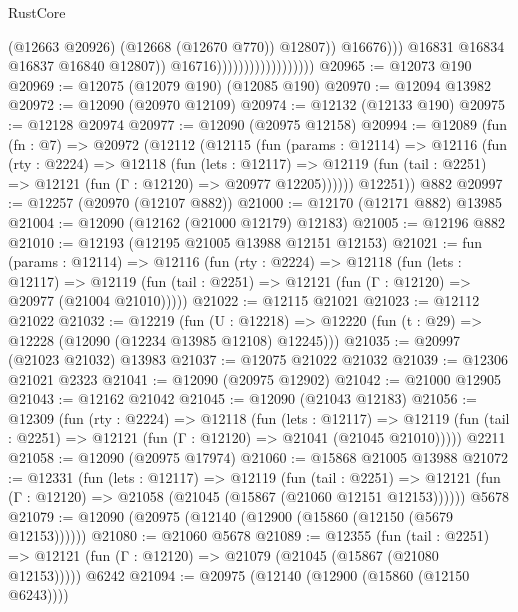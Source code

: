 \begin{lexlean}{RustCore}
\begin{coremodule}
                                                      (@12663 @20926)
                                                      (@12668 (@12670 @770))
                                                      @12807))
                                                  @16676)))
                                            @16831
                                            @16834
                                            @16837
                                            @16840
                                            @12807))
                                        @16716))))))))))))))))))
@20965 := @12073 @190
@20969 := @12075 (@12079 @190) (@12085 @190)
@20970 := @12094 @13982
@20972 := @12090 (@20970 @12109)
@20974 := @12132 (@12133 @190)
@20975 := @12128 @20974
@20977 := @12090 (@20975 @12158)
@20994 := @12089
    (fun (fn : @7) =>
    @20972
      (@12112
        (@12115
          (fun (params : @12114) =>
          @12116
            (fun (rty : @2224) =>
            @12118
              (fun (lets : @12117) =>
              @12119 (fun (tail : @2251) => @12121 (fun (Γ : @12120) => @20977 @12205))))))
        @12251))
    @882
@20997 := @12257 (@20970 (@12107 @882))
@21000 := @12170 (@12171 @882) @13985
@21004 := @12090 (@12162 (@21000 @12179) @12183)
@21005 := @12196 @882
@21010 := @12193 (@12195 @21005 @13988 @12151 @12153)
@21021 := fun (params : @12114) =>
  @12116
    (fun (rty : @2224) =>
    @12118
      (fun (lets : @12117) =>
      @12119 (fun (tail : @2251) => @12121 (fun (Γ : @12120) => @20977 (@21004 @21010)))))
@21022 := @12115 @21021
@21023 := @12112 @21022
@21032 := @12219
    (fun (U : @12218) => @12220 (fun (t : @29) => @12228 (@12090 (@12234 @13985 @12108) @12245)))
@21035 := @20997 (@21023 @21032) @13983
@21037 := @12075 @21022 @21032
@21039 := @12306 @21021 @2323
@21041 := @12090 (@20975 @12902)
@21042 := @21000 @12905
@21043 := @12162 @21042
@21045 := @12090 (@21043 @12183)
@21056 := @12309
    (fun (rty : @2224) =>
    @12118
      (fun (lets : @12117) =>
      @12119 (fun (tail : @2251) => @12121 (fun (Γ : @12120) => @21041 (@21045 @21010)))))
    @2211
@21058 := @12090 (@20975 @17974)
@21060 := @15868 @21005 @13988
@21072 := @12331
    (fun (lets : @12117) =>
    @12119
      (fun (tail : @2251) =>
      @12121 (fun (Γ : @12120) => @21058 (@21045 (@15867 (@21060 @12151 @12153))))))
    @5678
@21079 := @12090 (@20975 (@12140 (@12900 (@15860 (@12150 (@5679 @12153))))))
@21080 := @21060 @5678
@21089 := @12355
    (fun (tail : @2251) => @12121 (fun (Γ : @12120) => @21079 (@21045 (@15867 (@21080 @12153)))))
    @6242
@21094 := @20975 (@12140 (@12900 (@15860 (@12150 @6243))))

\end{coremodule}
\end{lexlean}
